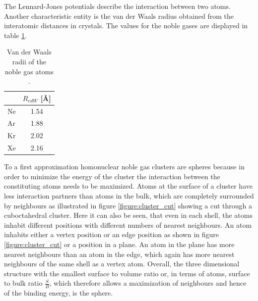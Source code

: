 The Lennard-Jones potentials describe the interaction between two atoms.
Another characteristic entity is the van der Waals radius obtained from
the interatomic distances in crystals. The values for the noble gases
are displayed in table \ref{table:vdWaalsradii}.

\begin{table}
 \caption{Van der Waals radii of the noble gas atoms \cite{Bondi64}.}
 \centering
 \begin{tabular}{lc}
  \toprule
                & $R_{vdW}$ [\AA] \\
  \midrule
    Ne          & 1.54 \\
    Ar          & 1.88 \\
    Kr          & 2.02 \\
    Xe          & 2.16 \\
  \bottomrule
 \end{tabular}
 \label{table:vdWaalsradii}
\end{table}

To a first approximation homonuclear noble gas clusters are spheres
because in order to minimize
the energy of the cluster the interaction between the constituting atoms needs to be
maximized. Atoms at the surface of a cluster have less interaction
partners than atoms in the bulk, which are completely surrounded by neighbours
as illustrated in figure \ref{figure:cluster_cut} showing
a cut through a cuboctahedral cluster.
Here it can also be seen, that even in each shell, the atoms inhabit different
positions with different numbers of nearest neighbours.
An atom inhabits either a vertex position or an edge position
as shown in figure \ref{figure:cluster_cut} or a position in a plane.
An atom
in the plane has more nearest neighbours than an atom in the edge, which again
has more nearest neighbours of the same shell as a vertex atom.
Overall, the three dimensional structure
with the smallest surface to volume ratio or, in terms of atoms, surface to bulk
ratio $\frac{S}{B}$, which therefore allows a maximization of neighbours and
hence of the binding
energy, is the sphere. 


